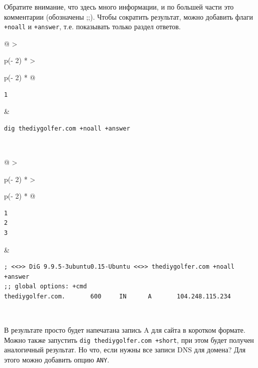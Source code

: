 \documentclass{report}
\begin{document}
Обратите внимание, что здесь много информации, и по большей части это
комментарии (обозначены ;;). Чтобы сократить результат, можно добавить
флаги \texttt{+noall} и \texttt{+answer}, т.е. показывать только раздел
ответов.

\begin{longtable}[]{@{}
  >{\raggedright\arraybackslash}p{(\columnwidth - 2\tabcolsep) * }
  >{\raggedright\arraybackslash}p{(\columnwidth - 2\tabcolsep) * }@{}}
\toprule
\endhead
\begin{minipage}[t]{\linewidth}\raggedright
\begin{verbatim}
1
\end{verbatim}
\end{minipage} & \begin{minipage}[t]{\linewidth}\raggedright
\begin{verbatim}
dig thediygolfer.com +noall +answer
\end{verbatim}
\end{minipage} \\ \addlinespace
\bottomrule
\end{longtable}

\begin{longtable}[]{@{}
  >{\raggedright\arraybackslash}p{(\columnwidth - 2\tabcolsep) * }
  >{\raggedright\arraybackslash}p{(\columnwidth - 2\tabcolsep) * }@{}}
\toprule
\endhead
\begin{minipage}[t]{\linewidth}\raggedright
\begin{verbatim}
1
2
3
\end{verbatim}
\end{minipage} & \begin{minipage}[t]{\linewidth}\raggedright
\begin{verbatim}
; <<>> DiG 9.9.5-3ubuntu0.15-Ubuntu <<>> thediygolfer.com +noall +answer
;; global options: +cmd
thediygolfer.com.       600     IN      A       104.248.115.234
\end{verbatim}
\end{minipage} \\ \addlinespace
\bottomrule
\end{longtable}

В результате просто будет напечатана запись A для сайта в коротком
формате. Можно также запустить \texttt{dig\ thediygolfer.com\ +short},
при этом будет получен аналогичный результат. Но что, если нужны все
записи DNS для домена? Для этого можно добавить опцию \texttt{ANY}.
\end{document}

